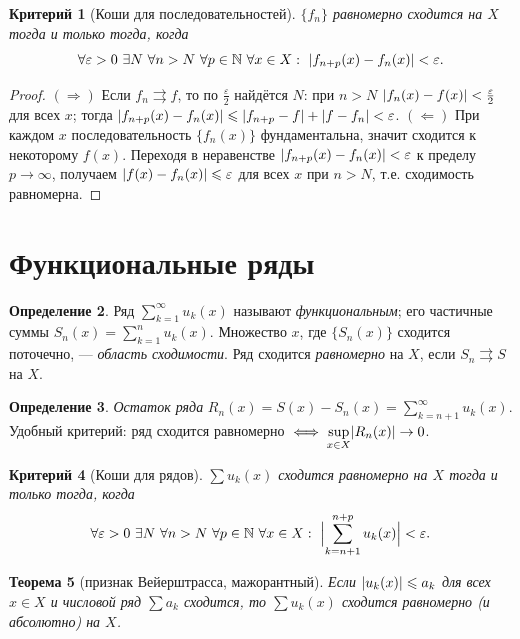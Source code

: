 \documentclass[11pt,a4paper]{article}
\theoremstyle{definition}
\newtheorem{definition}{Определение}[section]
\theoremstyle{plain}
\newtheorem{theorem}[definition]{Теорема}
\newtheorem{criterion}[definition]{Критерий}
\newcommand{\N}{\mathbb{N}}
\newcommand{\eps}{\varepsilon}
\renewcommand{\le}{\leqslant}
\DeclarePairedDelimiter{\abs}{\lvert}{\rvert}
\begin{document}
\begin{criterion}[Коши для последовательностей]
$\{f_n\}$ равномерно сходится на $X$ тогда и только тогда, когда
\[
  \forall\eps>0\ \exists N\ \forall n>N\ \forall p\in\N\ \forall x\in X:\
  \abs{f_{n+p}(x)-f_n(x)}<\eps .
\]
\end{criterion}

\begin{proof}
$(\Rightarrow)$ Если $f_n\rightrightarrows f$, то по $\tfrac\eps2$ найдётся $N$: при $n>N$
$\abs{f_n(x)-f(x)}<\tfrac\eps2$ для всех $x$; тогда
$\abs{f_{n+p}(x)-f_n(x)}\le\abs{f_{n+p}-f}+\abs{f-f_n}<\eps$. $(\Leftarrow)$ При каждом $x$
последовательность $\{f_n(x)\}$ фундаментальна, значит сходится к некоторому $f(x)$. Переходя в
неравенстве $\abs{f_{n+p}(x)-f_n(x)}<\eps$ к пределу $p\to\infty$, получаем
$\abs{f(x)-f_n(x)}\le\eps$ для всех $x$ при $n>N$, т.е. сходимость равномерна.
\end{proof}

\section{Функциональные ряды}

\begin{definition}
Ряд $\displaystyle\sum_{k=1}^\infty u_k(x)$ называют \emph{функциональным}; его частичные суммы
$S_n(x)=\sum_{k=1}^n u_k(x)$. Множество $x$, где $\{S_n(x)\}$ сходится поточечно, — \emph{область
сходимости}. Ряд сходится \emph{равномерно} на $X$, если $S_n\rightrightarrows S$ на $X$.
\end{definition}

\begin{definition}
\emph{Остаток ряда} $\displaystyle R_n(x)=S(x)-S_n(x)=\sum_{k=n+1}^\infty u_k(x)$. Удобный
критерий: ряд сходится равномерно $\iff\displaystyle\sup_{x\in X}\abs{R_n(x)}\to0$.
\end{definition}

\begin{criterion}[Коши для рядов]
$\sum u_k(x)$ сходится равномерно на $X$ тогда и только тогда, когда
\[
  \forall\eps>0\ \exists N\ \forall n>N\ \forall p\in\N\ \forall x\in X:\
  \abs[\Big]{\sum_{k=n+1}^{n+p}u_k(x)}<\eps .
\]
\end{criterion}

\begin{theorem}[признак Вейерштрасса, мажорантный]
Если $\abs{u_k(x)}\le a_k$ для всех $x\in X$ и числовой ряд $\sum a_k$ сходится, то
$\sum u_k(x)$ сходится равномерно (и абсолютно) на $X$.
\end{theorem}
\end{document}
